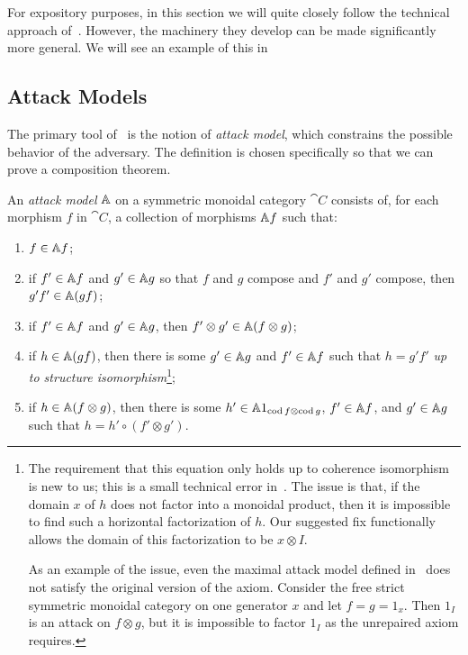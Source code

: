 For expository purposes, in this section we will quite closely follow the
technical approach of~\cite{broadbent-karvonen-2022}. However, the machinery
they develop can be made significantly more general. We will see an example of
this in 

\subsection{Attack Models}
\label{sec:attack-models}

The primary tool of~\cite{broadbent-karvonen-2022} is the notion of \emph{attack
model}, which constrains the possible behavior of the adversary. The definition
is chosen specifically so that we can prove a composition theorem.

\begin{dfn}
  An \emph{attack model} $\AA$ on a symmetric monoidal category $\cat{C}$
  consists of, for each morphism $f$ in $\cat{C}$, a collection of morphisms
  $\AA f$ such that:
  \begin{enumerate}
    \item \label{item:am-id} $f\in \AA f$;
    \item \label{item:am-seq-comp} if $f'\in\AA f$ and $g'\in\AA g$ so that $f$ and $g$ compose and $f'$
      and $g'$ compose, then $g'f'\in\AA (gf)$;
    \item \label{item:am-con-comp} if $f'\in\AA f$ and $g'\in\AA g$, then $f'\otimes g'\in\AA (f\otimes
      g)$;
    \item \label{item:am-seq-fact} if $h\in\AA (gf)$, then there is some $g'\in\AA g$ and $f'\in\AA f$ such
      that $h = g'f'$ \emph{up to structure isomorphism}\footnote{
        The requirement that this equation only holds up to coherence
        isomorphism is new to us; this is a small technical error
        in~\cite{broadbent-karvonen-2022}. The issue is that, if the domain $x$
        of $h$ does not factor into a monoidal product, then it is impossible to
        find such a horizontal factorization of $h$. Our suggested fix
        functionally allows the domain of this factorization to be $x\otimes I$.

        As an example of the issue, even the maximal attack model defined
        in~ does not satisfy the original
        version of the axiom. Consider the free strict symmetric monoidal
        category on one generator $x$ and let $f = g = 1_x.$ Then $1_I$ is an
        attack on $f\otimes g$, but it is impossible to factor $1_I$ as the
        unrepaired axiom requires.
      };
    \item \label{item:am-con-fact} if $h\in\AA (f\otimes g)$, then there is some $h'\in\AA 1_{\cod
      f\otimes\cod g}$, $f'\in\AA f$, and $g'\in\AA g$ such that $h = h'\circ
      (f'\otimes g')$.
  \end{enumerate}
\end{dfn}

